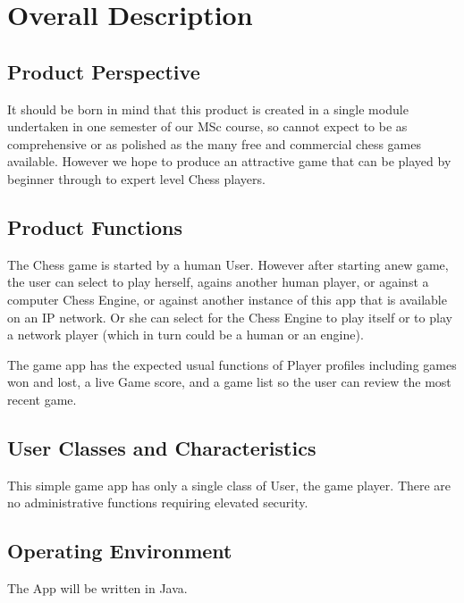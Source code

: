 \documentclass[a4paper,10pt]{article}
\begin{document}
\section{Overall Description}
\subsection{Product Perspective}
It should be born in mind that this product is created in a single module undertaken in one semester of our MSc course, so cannot expect to be as comprehensive or as polished as the many free and commercial chess games available. However we hope to produce an attractive game that can be played by beginner through to expert level Chess players.

\subsection{Product Functions}

The Chess game is started by a human User. However after starting anew game, the user can select to play herself, agains another human player, or against a computer Chess Engine, or against another instance of this app that is available on an IP network. Or she can select for the Chess Engine to play itself or to play a network player (which in turn could be a human or an engine). 

The game app has the expected usual functions of Player profiles including games won and lost, a live Game score, and a game list so the user can review the most recent game. 

\subsection{User Classes and Characteristics}
This simple game app has only a single class of User, the game player. There are no administrative functions requiring elevated security. 

\subsection{Operating Environment}

The App will be written in Java.

\end{document}
